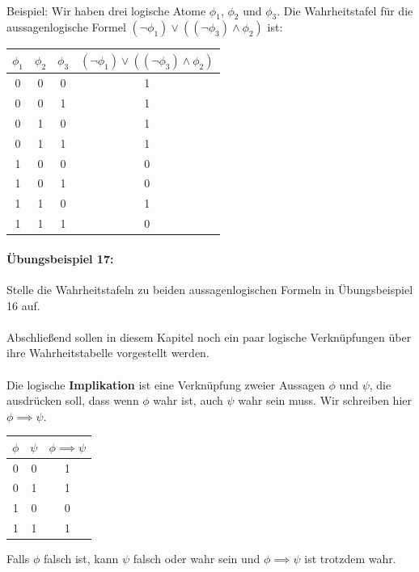 \documentclass[11pt,a4paper,leqno]{report}
\numberwithin{equation}{chapter}
\begin{document}
\\
Beispiel: Wir haben drei logische Atome $\phi_1$, $\phi_2$ und $\phi_3$. Die Wahrheitstafel f\"ur die aussagenlogische Formel $(\neg\phi_1)\vee((\neg\phi_3)\wedge\phi_2)$ ist:
\begin{center}
	\begin{tabular}{|c c c|c|}
	$\phi_1$ & $\phi_2$ & $\phi_3$ & $(\neg\phi_1)\vee((\neg\phi_3)\wedge\phi_2)$\\
	\hline
	0 & 0 & 0 & 1\\
	0 & 0 & 1 & 1\\
	0 & 1 & 0 & 1\\
	0 & 1 & 1 & 1\\
	1 & 0 & 0 & 0\\
	1 & 0 & 1 & 0\\
	1 & 1 & 0 & 1\\
	1 & 1 & 1 & 0\\
\end{tabular}  
\end{center}
\paragraph{\"Ubungsbeispiel 17:} Stelle die Wahrheitstafeln zu beiden aussagenlogischen Formeln in \"Ubungsbeispiel 16 auf.\\
\\
Abschlie\ss{}end sollen in diesem Kapitel noch ein paar logische Verkn\"upfungen \"uber ihre Wahrheitstabelle vorgestellt werden.\\
\\
Die logische \textbf{Implikation} ist eine Verkn\"upfung zweier Aussagen $\phi$ und $\psi$, die ausdr\"ucken soll, dass wenn $\phi$ wahr ist, auch $\psi$ wahr sein muss. Wir schreiben hier $\phi \implies \psi$.\\
\begin{center}
\begin{tabular}{|c c|c|}
	$\phi$ & $\psi$ & $\phi \implies \psi$\\
	\hline
	0 & 0 & 1\\
	0 & 1 & 1\\
	1 & 0 & 0\\
	1 & 1 & 1\\
\end{tabular}  
\end{center}
Falls $\phi$ falsch ist, kann $\psi$ falsch oder wahr sein und $\phi\implies\psi$ ist trotzdem wahr.
\end{document}
